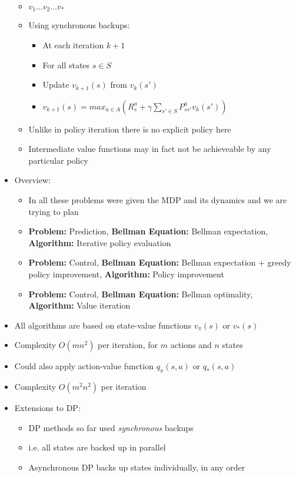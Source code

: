 \documentclass[12pt]{article}
\begin{document}
\begin{itemize}
\begin{itemize}
      \item $v_1 \dots v_2 \dots v_*$
      \item Using synchronous backups:
      \begin{itemize}
        \item At each iteration $k+1$
        \item For all states $s \in S$
        \item Update $v_{k+1}(s)$ from $v_k(s')$
        \item $v_{k+1}(s) = max_{a \in A}(R_s^a + \gamma \sum_{s' \in S}P_{ss'}^a v_{k}(s'))$
      \end{itemize}
      \item Unlike in policy iteration there is no explicit policy here
      \item Intermediate value functions may in fact not be achieveable by any particular policy
    \end{itemize}
    \item Overview:
    \begin{itemize}
      \item In all these problems were given the MDP and its dynamics and we are trying to plan
      \item \textbf{Problem:} Prediction, \textbf{Bellman Equation:} Bellman expectation, \textbf{Algorithm:} Iterative policy evaluation
      \item \textbf{Problem:} Control, \textbf{Bellman Equation:} Bellman expectation + greedy policy improvement, \textbf{Algorithm:} Policy improvement 
      \item \textbf{Problem:} Control, \textbf{Bellman Equation:} Bellman optimality, \textbf{Algorithm:} Value iteration
    \end{itemize}
    \item All algorithms are based on state-value functions $v_\pi(s)$ or $v_*(s)$
    \item Complexity $O(mn^2)$ per iteration, for $m$ actions and $n$ states
    \item Could also apply action-value function $q_\pi(s,a)$ or $q_*(s,a)$
    \item Complexity $O(m^2n^2)$ per iteration
    \item Extensions to DP:
    \begin{itemize}
      \item DP methods so far used \textit{synchronous} backups
      \item i.e. all states are backed up in parallel
      \item Asynchronous DP backs up states individually, in any order

\end{itemize}
\end{itemize}
\end{document}
